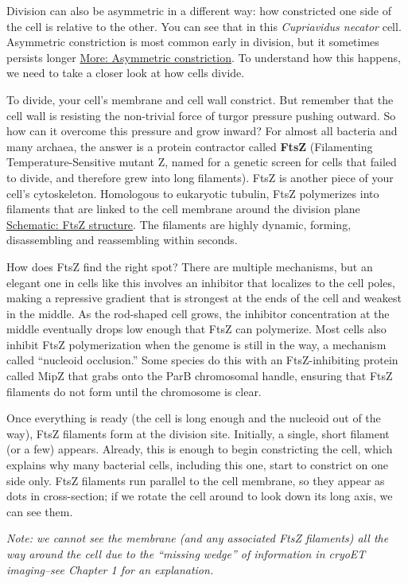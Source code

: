 \documentclass[]{tufte-book}
\begin{document}
Division can also be asymmetric in a different way: how constricted one side of the cell is relative to the other. You can see that in this \emph{Cupriavidus necator} cell. Asymmetric constriction is most common early in division, but it sometimes persists longer \protect\hyperlink{Asymmetric_constriction}{More: Asymmetric constriction}. To understand how this happens, we need to take a closer look at how cells divide.

To divide, your cell's membrane and cell wall constrict. But remember that the cell wall is resisting the non-trivial force of turgor pressure pushing outward. So how can it overcome this pressure and grow inward? For almost all bacteria and many archaea, the answer is a protein contractor called \textbf{FtsZ} (Filamenting Temperature-Sensitive mutant Z, named for a genetic screen for cells that failed to divide, and therefore grew into long filaments). FtsZ is another piece of your cell's cytoskeleton. Homologous to eukaryotic tubulin, FtsZ polymerizes into filaments that are linked to the cell membrane around the division plane \protect\hyperlink{FtsZ_structure}{Schematic: FtsZ structure}. The filaments are highly dynamic, forming, disassembling and reassembling within seconds.

How does FtsZ find the right spot? There are multiple mechanisms, but an elegant one in cells like this involves an inhibitor that localizes to the cell poles, making a repressive gradient that is strongest at the ends of the cell and weakest in the middle. As the rod-shaped cell grows, the inhibitor concentration at the middle eventually drops low enough that FtsZ can polymerize. Most cells also inhibit FtsZ polymerization when the genome is still in the way, a mechanism called ``nucleoid occlusion.'' Some species do this with an FtsZ-inhibiting protein called MipZ that grabs onto the ParB chromosomal handle, ensuring that FtsZ filaments do not form until the chromosome is clear.

Once everything is ready (the cell is long enough and the nucleoid out of the way), FtsZ filaments form at the division site. Initially, a single, short filament (or a few) appears. Already, this is enough to begin constricting the cell, which explains why many bacterial cells, including this one, start to constrict on one side only. FtsZ filaments run parallel to the cell membrane, so they appear as dots in cross-section; if we rotate the cell around to look down its long axis, we can see them.

\emph{Note: we cannot see the membrane (and any associated FtsZ filaments) all the way around the cell due to the ``missing wedge'' of information in cryoET imaging--see Chapter 1 for an explanation.}
\end{document}

